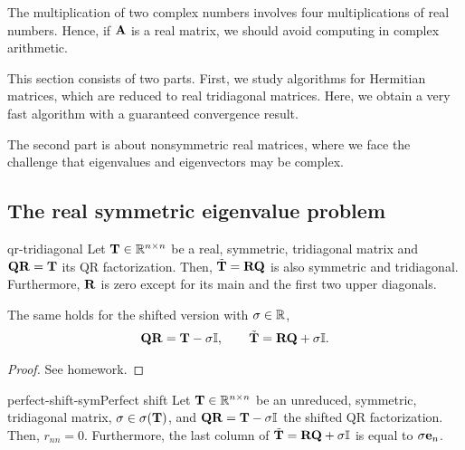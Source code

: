 \begin{intro}
  The multiplication of two complex numbers involves four
  multiplications of real numbers. Hence, if $\mathbf A$ is a real matrix,
  we should avoid computing in complex arithmetic.

  This section consists of two parts. First, we study algorithms for
  Hermitian matrices, which are reduced to real tridiagonal
  matrices. Here, we obtain a very fast algorithm with a guaranteed
  convergence result.

  The second part is about nonsymmetric real matrices, where we face
  the challenge that eigenvalues and eigenvectors may be complex.
\end{intro}

\subsection{The real symmetric eigenvalue problem}

\begin{Lemma}{qr-tridiagonal}
  Let $\mathbf T\in\mathbb R^{n\times n}$ be a real, symmetric, tridiagonal matrix and
  $\mathbf Q\mathbf R=\mathbf T$ its QR factorization. Then, $\tilde{\mathbf T}=\mathbf R\mathbf Q$ is also
  symmetric and tridiagonal. Furthermore, $\mathbf R$ is zero except for
  its main and the first two upper diagonals.

  The same holds for the shifted version with $\sigma\in\mathbb R$,
  \begin{gather}
    \mathbf Q\mathbf R = \mathbf T-\sigma\mathbb I,\qquad \tilde{\mathbf T} = \mathbf R\mathbf Q+\sigma\mathbb I.
  \end{gather}
\end{Lemma}

\begin{proof}
  See homework.
\end{proof}

\begin{Lemma*}{perfect-shift-sym}{Perfect shift}
  Let $\mathbf T\in\mathbb R^{n\times n}$ be an unreduced, symmetric, tridiagonal matrix,
  $\sigma\in\sigma(\mathbf T)$, and $\mathbf Q\mathbf R=\mathbf T-\sigma\mathbb I$ the
  shifted QR factorization. Then, $r_{nn}=0$. Furthermore, the last
  column of $\tilde{\mathbf T} = \mathbf R\mathbf Q+\sigma\mathbb I$ is equal to
  $\sigma\mathbf e_n$.
\end{Lemma*}


